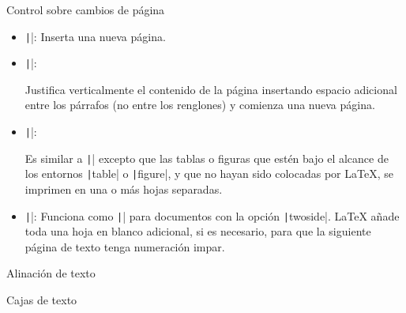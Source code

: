 \begin{frame}
	\frametitle{}

	\begin{block}{Control sobre cambios de página}
		\begin{itemize}
			\item

			      \texttt|\newpage|: Inserta una nueva página.

			\item

			      \texttt|\pagebreak|:

			      Justifica verticalmente el contenido de la página
			      insertando espacio adicional entre los párrafos
			      (no entre los renglones) y comienza una nueva página.

			\item

			      \texttt|\clearpage|:

			      Es similar a \texttt|\newpage| excepto que las
			      tablas o figuras que estén bajo el alcance de los
			      entornos \texttt|table| o
			      \texttt|figure|, y que no hayan sido colocadas
			      por \LaTeX{}, se imprimen en una o más hojas separadas.

			\item

			      \texttt|\cleardoublepage|:
			      Funciona como \texttt|\clearpage| para
			      documentos con la opción \texttt|twoside|.
			      \LaTeX{} añade toda una hoja en blanco adicional, si es
			      necesario, para que la siguiente página de texto tenga
			      numeración impar.
		\end{itemize}
	\end{block}

	\begin{block}{Alinación de texto}\end{block} %
\end{frame}

\begin{frame}
	\begin{block}{Cajas de texto}\end{block} %
\end{frame}
